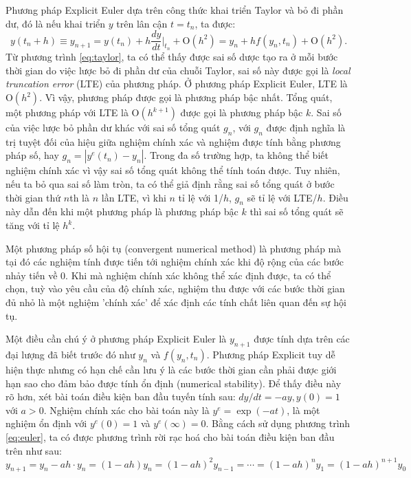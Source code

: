 \documentclass[a4paper]{article}
\begin{document}
Phương pháp Explicit Euler dựa trên công thức khai triển Taylor và bỏ đi phần dư, đó là nếu khai triển $y$ trên lân cận $t = t_n$, ta được:
\begin{equation}\label{eq:taylor}
y(t_n + h) \equiv y_{n+1} = y(t_n) + h \frac{dy}{dt}\vert _{t_n} + {\mbox{O}}(h^2) = y_n + h f(y_n,t_n) + {\mbox{O}}(h^2).
\end{equation}
Từ phương trình \eqref{eq:taylor}, ta có thể thấy được sai số dược tạo ra ở mỗi bước thời gian do việc lược bỏ đi phần dư của chuỗi Taylor, sai số này được gọi là \textit{local truncation error} (LTE) của phương pháp. Ở phương pháp Explicit Euler, LTE là $\mbox{O}(h^2)$. Vì vậy, phương pháp được gọi là phương pháp bậc nhất. Tổng quát, một phương pháp với LTE là $\mbox{O}(h^{k+1})$ được gọi là phương pháp bậc $k$. Sai số của việc lược bỏ phần dư khác với sai số tổng quát $g_n$, với $g_n$ được định nghĩa là trị tuyệt đối của hiệu giữa nghiệm chính xác và nghiệm được tính bằng phương pháp số, hay $g_n = |y^e(t_n) - y_n|$. Trong đa số trường hợp, ta không thể biết nghiệm chính xác vì vậy sai số tổng quát không thể tính toán được. Tuy nhiên, nếu ta bỏ qua sai số làm tròn, ta có thể giả định rằng sai số tổng quát ở bước thời gian thứ $n$th là $n$ lần LTE, vì khi $n$ tỉ lệ với 1/$h$, $g_n$ sẽ tỉ lệ với LTE/$h$. Điều này dẫn đến khi một phương pháp là phương pháp bậc $k$ thì sai số tổng quát sẽ tăng với tỉ lệ $h^k$.
\par
Một phương pháp số hội tụ (convergent numerical method) là phương pháp mà tại đó các nghiệm tính được tiến tới nghiệm chính xác khi độ rộng của các bước nhảy tiến về 0. Khi mà nghiệm chính xác không thể xác định được, ta có thể chọn, tuỳ vào yêu cầu của độ chính xác, nghiệm thu được với các bước thời gian đủ nhỏ là một nghiệm 'chính xác' để xác định các tính chất liên quan đến sự hội tụ. 
\par
Một điều cần chú ý ở phương pháp Explicit Euler là $y_{n+1}$ được tính dựa trên các đại lượng đã biết trước đó như $y_n$ và $f(y_n, t_n)$. Phương pháp Explicit tuy dễ hiện thực nhưng có hạn chế cần lưu ý là các bước thời gian cần phải được giới hạn sao cho đảm bảo được tính ổn định (numerical stability). Để thấy điều này rõ hơn, xét bài toán điều kiện ban đầu tuyến tính sau: $dy/dt = -ay, y(0) = 1$ với $a>0$. Nghiệm chính xác cho bài toán này là $y^e=\exp(-at)$, là một nghiệm ổn định với $y^e(0) = 1$ và $y^e(\infty) = 0$. Bằng cách sử dụng phương trình \eqref{eq:euler}, ta có được phương trình rời rạc hoá cho bài toán điều kiện ban đầu trên như sau: 
\begin{equation}\label{eq:stability}
    y_{n+1} = y_{n} -ah\cdot y_{n} = (1-ah) y_n = (1-ah)^{2} y_{n-1} = \cdots = (1-ah)^n y_1 = (1-ah)^{n+1} y_0
\end{equation}
\end{document}
